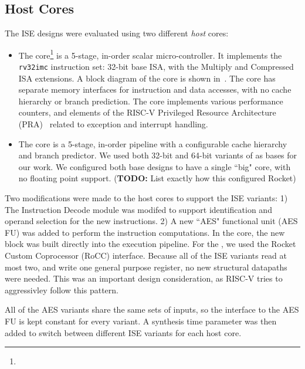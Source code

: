 
\subsection{Host Cores}

The ISE designs were evaluated using two different {\em host} cores:

\begin{itemize}
\item
    The  core\footnote{%
}   is a 5-stage, in-order scalar micro-controller.
    It implements the
    {\tt rv32imc}
    instruction set: 32-bit base ISA, with the Multiply and Compressed
    ISA extensions.
    A block diagram of the core is shown in~.
    The core has separate memory interfaces for instruction and data
    accesses, with no cache hierarchy or branch prediction.
    The core implements various performance counters,
    and
    elements of the
    RISC-V Privileged Resource Architecture 
    (PRA)~\cite[Chapter 3]{RV:ISA:II:17}
    related to exception and interrupt handling.

\item
    The  core\cite{rocket:16} 
    is a 5-stage, in-order pipeline with a configurable cache hierarchy and
    branch predictor.
    We used both 32-bit and 64-bit variants of  as bases for our work.
    We configured both base designs to have a single ``big" core, with
    no floating point support.
    ({\bf TODO:} List exactly how this configured Rocket)

\end{itemize}

Two modifications were made to the host cores to support the ISE variants:
1) The Instruction Decode module was modifed to support identification and
   operand selection for the new instructions. 
2) A new ``AES" functional unit (AES FU) was added to perform the instruction
   computations.
In the  core, the new block was built directly into the execution
pipeline.
For the , we used the Rocket Custom Coprocessor (RoCC)
interface.
Because all of the ISE variants read at most two,
and write one general purpose register, no new structural datapaths
were needed.
This was an important design consideration, as RISC-V tries to
aggressivley follow this pattern.

All of the AES variants share the same sets of inputs, so the interface
to the AES FU is kept constant for every variant.
A synthesis time parameter was then added to switch between different
ISE variants for each host core.

